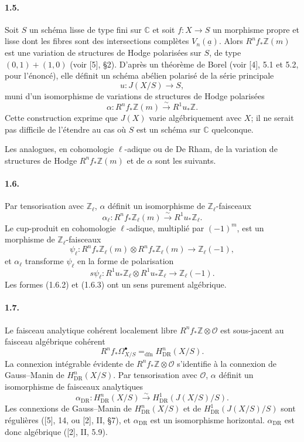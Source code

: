 \documentclass[10pt]{article}
\newcommand{\C}{\mathbb C}
\newcommand{\Z}{\mathbb Z}
\newcommand{\DR}{\mathrm{DR}}
\newcommand{\iso}{\xrightarrow{\sim}}
\begin{document}
\paragraph{1.5.} Soit \(S\) un schéma lisse de type fini sur \(\C\) et soit \(f:X\to S\) un morphisme propre et lisse dont les fibres sont des intersections complètes \(V_n(\underline a)\). Alors \(R^nf_*\Z(m)\) est une variation de structures de Hodge polarisées sur \(S\), de type \((0,1)+(1,0)\) (voir [5], §2). D'après un théorème de Borel (voir [4], 5.1 et 5.2, pour l'énoncé), elle définit un schéma abélien polarisé de la série principale
\[
u:J(X/S)\longrightarrow S,
\]
muni d'un isomorphisme de variations de structures de Hodge polarisées
\[
\alpha:R^nf_*\Z(m)\iso R^1u_*\Z.
\]
Cette construction exprime que \(J(X)\) varie algébriquement avec \(X\); il ne serait pas difficile de l'étendre au cas où \(S\) est un schéma sur \(\C\) quelconque.

Les analogues, en cohomologie \(\ell\)-adique ou de De Rham, de la variation de structures de Hodge \(R^nf_*\Z(m)\) et de \(\alpha\) sont les suivants.

\paragraph{1.6.} Par tensorisation avec \(\Z_\ell\), \(\alpha\) définit un isomorphisme de \(\Z_\ell\)-faisceaux
\[
\tag{1.6.1}
\alpha_\ell:R^nf_*\Z_\ell(m)\iso R^1u_*\Z_\ell.
\]
Le cup-produit en cohomologie \(\ell\)-adique, multiplié par \((-1)^m\), est un morphisme de \(\Z_\ell\)-faisceaux
\[
\tag{1.6.2}
\psi_\ell:R^nf_*\Z_\ell(m)\otimes R^nf_*\Z_\ell(m)\longrightarrow\Z_\ell(-1),
\]
et \(\alpha_\ell\) transforme \(\psi_\ell\) en la forme de polarisation
\[
\tag{1.6.3}
s\psi_\ell:R^1u_*\Z_\ell\otimes R^1u_*\Z_\ell\longrightarrow\Z_\ell(-1).
\]
Les formes (1.6.2) et (1.6.3) ont un sens purement algébrique.

\paragraph{1.7.} Le faisceau analytique cohérent localement libre \(R^nf_*\Z\otimes\mathcal O\) est sous-jacent au faisceau algébrique cohérent
\[
R^nf_*\Omega^\bullet_{X/S}=_{\mathrm{dfn}}H^n_{\DR}(X/S).
\]
La connexion intégrable évidente de \(R^nf_*\Z\otimes\mathcal O\) s'identifie à la connexion de Gauss--Manin de \(H^n_{\DR}(X/S)\). Par tensorisation avec \(\mathcal O\), \(\alpha\) définit un isomorphisme de faisceaux analytiques
\[
\tag{1.7.1}
\alpha_{\DR}:H^n_{\DR}(X/S)\iso H^1_{\DR}(J(X/S)/S).
\]
Les connexions de Gauss--Manin de \(H^n_{\DR}(X/S)\) et de \(H^1_{\DR}(J(X/S)/S)\) sont régulières ([5], 14, ou [2], II, §7), et \(\alpha_{\DR}\) est un isomorphisme horizontal. \(\alpha_{\DR}\) est donc algébrique ([2], II, 5.9).
\end{document}
